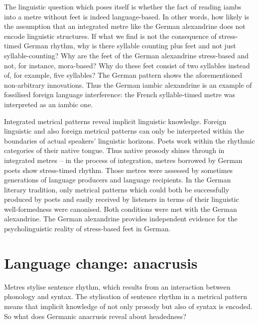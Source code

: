 \documentclass[output=paper
  ,nobabel
  ,uniformtopskip %
]{langscibook}
\begin{document}
The linguistic question which poses itself is whether the fact of reading iambs into a metre without feet is indeed language-based. In other words, how likely is the assumption that an integrated metre like the German alexandrine does not encode linguistic structures. If what we find is not the consequence of stress-timed German rhythm, why is there syllable counting plus feet and not just syllable-counting? Why are the feet of the German alexandrine stress-based and not, for instance, mora-based? Why do these feet consist of two syllables instead of, for example, five syllables? The German pattern shows the aforementioned non-arbitrary innovations. Thus the German iambic alexandrine is an example of fossilised foreign language interference: the French syllable-timed metre was interpreted as an iambic one. 

  Integrated metrical patterns reveal implicit linguistic knowledge. Foreign linguistic and also foreign metrical patterns can only be interpreted within the boundaries of actual speakers' linguistic horizons. Poets work within the rhythmic categories of their native tongue. Thus native prosody shines through in integrated metres – in the process of integration, metres borrowed by German poets show stress-timed rhythm. Those metres were assessed by sometimes generations of language producers and language recipients. In the German literary tradition, only metrical patterns which could both be successfully produced by poets and easily received by listeners in terms of their linguistic well-formedness were canonised. Both conditions were met with the German alexandrine. The German alexandrine provides independent evidence for the psycholinguistic reality of stress-based feet in German. 

\section{Language change: anacrusis}\label{sec-anacrusis}

Metres stylise sentence rhythm, which results from an interaction between phonology and syntax. The stylisation of sentence rhythm in a metrical pattern means that implicit knowledge of not only prosody but also of syntax is encoded. So what does Germanic anacrusis reveal about headedness?
\end{document}
